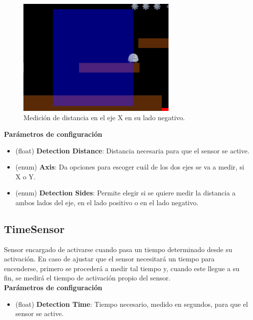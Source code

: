 \begin{itemize}
\begin{figure}[t]
		\centering
		\includegraphics[width = 0.7\textwidth]{Imagenes/SingleAxis_Image.png}
		\caption{Medición de distancia en el eje X en su lado negativo.}
		\label{fig:SingleAxis_Image}
\end{figure}
\textbf{Parámetros de configuración}
	\begin{itemize}
	        \item (float) \textbf{Detection Distance}: Distancia necesaria para que el sensor se active.
	        \item (enum) \textbf{Axis}: Da opciones para escoger cuál de los dos ejes se va a medir, si X o Y.
	        \item (enum) \textbf{Detection Sides}: Permite elegir si se quiere medir la distancia a ambos lados del eje, en el lado positivo o en el lado negativo.
	 \end{itemize}
\end{itemize}

\subsection{TimeSensor}

Sensor encargado de activarse cuando pasa un tiempo determinado desde su activación. En caso de ajustar que el sensor necesitará un tiempo para encenderse, primero se procederá a medir tal tiempo y, cuando este llegue a su fin, se medirá el tiempo de activación propio del sensor.\\

\textbf{Parámetros de configuración}
	\begin{itemize}
	        \item (float) \textbf{Detection Time}: Tiempo necesario, medido en segundos, para que el sensor se active.
	 \end{itemize}

